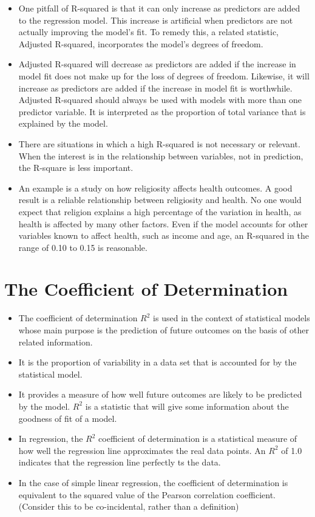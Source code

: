 \documentclass[]{report}
\begin{document}
\begin{itemize}
\item One pitfall of R-squared is that it can only increase as predictors are added to the regression model. This increase is artificial when predictors are not actually improving the model’s fit. To remedy this, a related statistic, Adjusted R-squared, incorporates the model’s degrees of freedom. 
\item Adjusted R-squared will decrease as predictors are added if the increase in model fit does not make up for the loss of degrees of freedom. Likewise, it will increase as predictors are added if the increase in model fit is worthwhile. Adjusted R-squared should always be used with models with more than one predictor variable. It is interpreted as the proportion of total variance that is explained by the model.
\item 
There are situations in which a high R-squared is not necessary or relevant. When the interest is in the relationship between variables, not in prediction, the R-square is less important. 
\item An example is a study on how religiosity affects health outcomes. A good result is a reliable relationship between religiosity and health. No one would expect that religion explains a high percentage of the variation in health, as health is affected by many other factors. Even if the model accounts for other variables known to affect health, such as income and age, an R-squared in the range of 0.10 to 0.15 is reasonable.
\end{itemize}
\medskip
\section*{The Coefficient of Determination}
\begin{itemize}
	
	\item  The coefficient of determination $R^2$ is used in the context of statistical models whose main purpose is
	the prediction of future outcomes on the basis of other related information.
	\item  It is the proportion of variability in a data set that is accounted for by the statistical model.
	\item  It provides a measure of how well future outcomes are likely to be predicted by the model. $R^2$ is a
	statistic that will give some information about the goodness of fit of a model.
	\item  In regression, the $R^2$ coefficient of determination is a statistical measure of how well the regression line
	approximates the real data points. An $R^2$ of 1.0 indicates that the regression line perfectly ts the data.
	\item  In the case of simple linear regression, the coefficient of determination is equivalent to the squared value
	of the Pearson correlation coefficient. (Consider this to be co-incidental, rather than a definition)
\end{itemize}
\newpage
\end{document}
